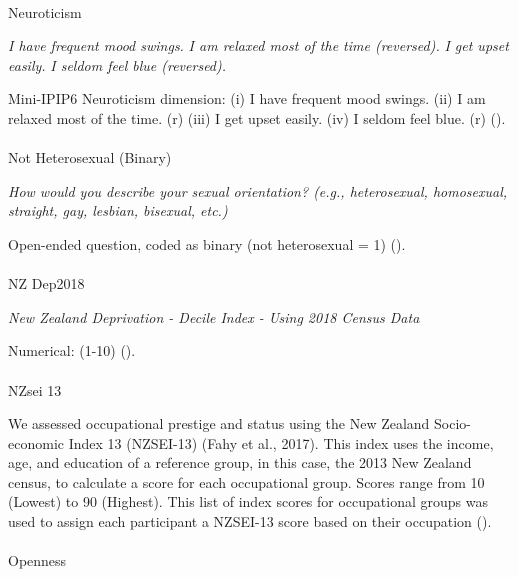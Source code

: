 \documentclass[
  single column]{article}
\makeatletter
\let\oldparagraph\paragraph
\renewcommand{\paragraph}{
    \@ifstar
      \xxxParagraphStar
      \xxxParagraphNoStar
  }
\newcommand{\xxxParagraphStar}[1]{\oldparagraph*{#1}\mbox{}}
\newcommand{\xxxParagraphNoStar}[1]{\oldparagraph{#1}\mbox{}}
\makeatother
\begin{document}
\paragraph{Neuroticism}\label{neuroticism}

\emph{I have frequent mood swings.} \emph{I am relaxed most of the time
(reversed).} \emph{I get upset easily.} \emph{I seldom feel blue
(reversed).}

Mini-IPIP6 Neuroticism dimension: (i) I have frequent mood swings. (ii)
I am relaxed most of the time. (r) (iii) I get upset easily. (iv) I
seldom feel blue. (r) ().

\paragraph{Not Heterosexual (Binary)}\label{not-heterosexual-binary}

\emph{How would you describe your sexual orientation? (e.g.,
heterosexual, homosexual, straight, gay, lesbian, bisexual, etc.)}

Open-ended question, coded as binary (not heterosexual = 1)
().

\paragraph{NZ Dep2018}\label{nz-dep2018}

\emph{New Zealand Deprivation - Decile Index - Using 2018 Census Data}

Numerical: (1-10) ().

\paragraph{NZsei 13}\label{nzsei-13}

We assessed occupational prestige and status using the New Zealand
Socio-economic Index 13 (NZSEI-13) (Fahy et al., 2017). This index uses
the income, age, and education of a reference group, in this case, the
2013 New Zealand census, to calculate a score for each occupational
group. Scores range from 10 (Lowest) to 90 (Highest). This list of index
scores for occupational groups was used to assign each participant a
NZSEI-13 score based on their occupation ().

\paragraph{Openness}\label{openness}
\end{document}
